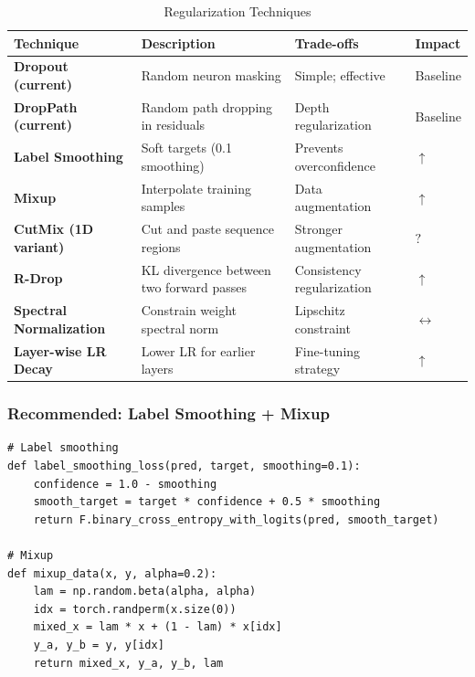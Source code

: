 \documentclass[11pt,a4paper]{article}
\begin{document}
\begin{longtable}{L{3cm}L{4cm}L{4cm}C{1.5cm}}
\caption{Regularization Techniques} \\
\toprule
\textbf{Technique} & \textbf{Description} & \textbf{Trade-offs} & \textbf{Impact} \\
\midrule
\endfirsthead
\bottomrule
\endlastfoot

\textbf{Dropout (current)} & Random neuron masking & Simple; effective & Baseline \\

\textbf{DropPath (current)} & Random path dropping in residuals & Depth regularization & Baseline \\

\textbf{Label Smoothing} & Soft targets (0.1 smoothing) & Prevents overconfidence & \textcolor{positive}{$\uparrow$} \\

\textbf{Mixup} & Interpolate training samples & Data augmentation & \textcolor{positive}{$\uparrow$} \\

\textbf{CutMix (1D variant)} & Cut and paste sequence regions & Stronger augmentation & \textcolor{uncertain}{$?$} \\

\textbf{R-Drop} & KL divergence between two forward passes & Consistency regularization & \textcolor{positive}{$\uparrow$} \\

\textbf{Spectral Normalization} & Constrain weight spectral norm & Lipschitz constraint & \textcolor{neutral}{$\leftrightarrow$} \\

\textbf{Layer-wise LR Decay} & Lower LR for earlier layers & Fine-tuning strategy & \textcolor{positive}{$\uparrow$} \\

\end{longtable}

\subsubsection{Recommended: Label Smoothing + Mixup}

\begin{verbatim}
# Label smoothing
def label_smoothing_loss(pred, target, smoothing=0.1):
    confidence = 1.0 - smoothing
    smooth_target = target * confidence + 0.5 * smoothing
    return F.binary_cross_entropy_with_logits(pred, smooth_target)

# Mixup
def mixup_data(x, y, alpha=0.2):
    lam = np.random.beta(alpha, alpha)
    idx = torch.randperm(x.size(0))
    mixed_x = lam * x + (1 - lam) * x[idx]
    y_a, y_b = y, y[idx]
    return mixed_x, y_a, y_b, lam
\end{verbatim}
\end{document}
